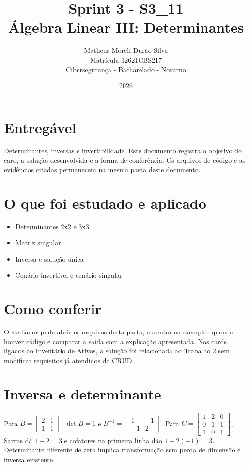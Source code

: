 \documentclass[12pt]{article}
\title{Sprint 3 - S3\_11\\Álgebra Linear III: Determinantes}
\author{Matheus Moreli Durão Silva\\Matrícula 12621CBS217\\Cibersegurança - Bacharelado - Noturno}
\date{2026}
\begin{document}
\maketitle

\section*{Entregável}
Determinantes, inversas e invertibilidade. Este documento registra o objetivo do card, a solução desenvolvida e a forma de conferência. Os arquivos de código e as evidências citadas permanecem na mesma pasta deste documento.

\section*{O que foi estudado e aplicado}
\begin{itemize}
\item Determinantes 2x2 e 3x3
\item Matriz singular
\item Inversa e solução única
\item Cenário invertível e cenário singular
\end{itemize}

\section*{Como conferir}
O avaliador pode abrir os arquivos desta pasta, executar os exemplos quando houver código e comparar a saída com a explicação apresentada. Nos cards ligados ao Inventário de Ativos, a solução foi relacionada ao Trabalho 2 sem modificar requisitos já atendidos do CRUD.

\section*{Inversa e determinante}
Para $B=\left[\begin{smallmatrix}2&1\\1&1\end{smallmatrix}\right]$, $\det B=1$ e $B^{-1}=\left[\begin{smallmatrix}1&-1\\-1&2\end{smallmatrix}\right]$. Para $C=\left[\begin{smallmatrix}1&2&0\\0&1&1\\1&0&1\end{smallmatrix}\right]$, Sarrus dá $1+2=3$ e cofatores na primeira linha dão $1-2(-1)=3$. Determinante diferente de zero implica transformação sem perda de dimensão e inversa existente.
\end{document}
